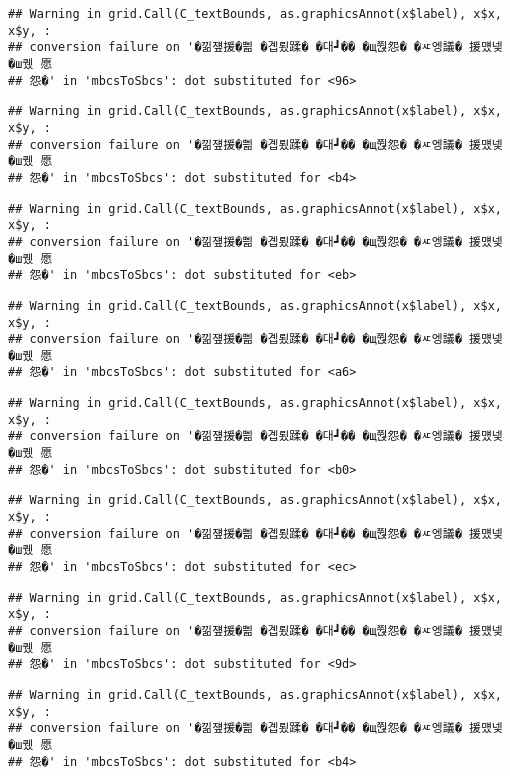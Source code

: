 \documentclass[
]{article}
\begin{document}
\begin{verbatim}
## Warning in grid.Call(C_textBounds, as.graphicsAnnot(x$label), x$x, x$y, :
## conversion failure on '�낆쟾援�쁾 �곕룄蹂� �대┛�� �щ쭩怨� �ㅼ엥議� 援먰넻�ш퀬 愿
## 怨�' in 'mbcsToSbcs': dot substituted for <96>
\end{verbatim}

\begin{verbatim}
## Warning in grid.Call(C_textBounds, as.graphicsAnnot(x$label), x$x, x$y, :
## conversion failure on '�낆쟾援�쁾 �곕룄蹂� �대┛�� �щ쭩怨� �ㅼ엥議� 援먰넻�ш퀬 愿
## 怨�' in 'mbcsToSbcs': dot substituted for <b4>
\end{verbatim}

\begin{verbatim}
## Warning in grid.Call(C_textBounds, as.graphicsAnnot(x$label), x$x, x$y, :
## conversion failure on '�낆쟾援�쁾 �곕룄蹂� �대┛�� �щ쭩怨� �ㅼ엥議� 援먰넻�ш퀬 愿
## 怨�' in 'mbcsToSbcs': dot substituted for <eb>
\end{verbatim}

\begin{verbatim}
## Warning in grid.Call(C_textBounds, as.graphicsAnnot(x$label), x$x, x$y, :
## conversion failure on '�낆쟾援�쁾 �곕룄蹂� �대┛�� �щ쭩怨� �ㅼ엥議� 援먰넻�ш퀬 愿
## 怨�' in 'mbcsToSbcs': dot substituted for <a6>
\end{verbatim}

\begin{verbatim}
## Warning in grid.Call(C_textBounds, as.graphicsAnnot(x$label), x$x, x$y, :
## conversion failure on '�낆쟾援�쁾 �곕룄蹂� �대┛�� �щ쭩怨� �ㅼ엥議� 援먰넻�ш퀬 愿
## 怨�' in 'mbcsToSbcs': dot substituted for <b0>
\end{verbatim}

\begin{verbatim}
## Warning in grid.Call(C_textBounds, as.graphicsAnnot(x$label), x$x, x$y, :
## conversion failure on '�낆쟾援�쁾 �곕룄蹂� �대┛�� �щ쭩怨� �ㅼ엥議� 援먰넻�ш퀬 愿
## 怨�' in 'mbcsToSbcs': dot substituted for <ec>
\end{verbatim}

\begin{verbatim}
## Warning in grid.Call(C_textBounds, as.graphicsAnnot(x$label), x$x, x$y, :
## conversion failure on '�낆쟾援�쁾 �곕룄蹂� �대┛�� �щ쭩怨� �ㅼ엥議� 援먰넻�ш퀬 愿
## 怨�' in 'mbcsToSbcs': dot substituted for <9d>
\end{verbatim}

\begin{verbatim}
## Warning in grid.Call(C_textBounds, as.graphicsAnnot(x$label), x$x, x$y, :
## conversion failure on '�낆쟾援�쁾 �곕룄蹂� �대┛�� �щ쭩怨� �ㅼ엥議� 援먰넻�ш퀬 愿
## 怨�' in 'mbcsToSbcs': dot substituted for <b4>
\end{verbatim}
\end{document}
